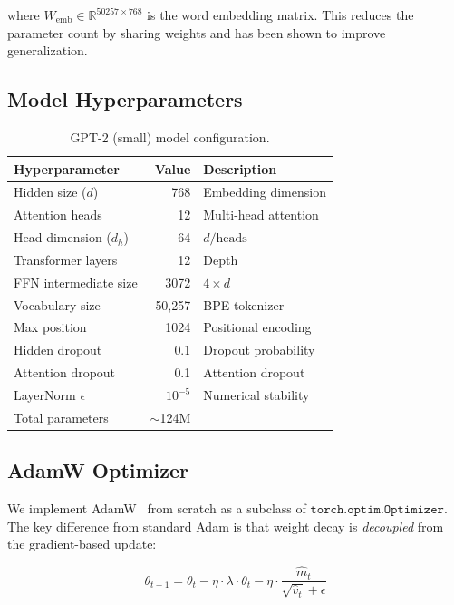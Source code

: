 \documentclass[11pt,a4paper]{article}
\begin{document}
where $W_{\text{emb}} \in \mathbb{R}^{50257 \times 768}$ is the word embedding matrix. This reduces the parameter count by sharing weights and has been shown to improve generalization.

\subsection{Model Hyperparameters}

\begin{table}[H]
\centering
\begin{tabular}{lrl}
\toprule
\textbf{Hyperparameter} & \textbf{Value} & \textbf{Description} \\
\midrule
Hidden size ($d$) & 768 & Embedding dimension \\
Attention heads & 12 & Multi-head attention \\
Head dimension ($d_h$) & 64 & $d / \text{heads}$ \\
Transformer layers & 12 & Depth \\
FFN intermediate size & 3072 & $4 \times d$ \\
Vocabulary size & 50,257 & BPE tokenizer \\
Max position & 1024 & Positional encoding \\
Hidden dropout & 0.1 & Dropout probability \\
Attention dropout & 0.1 & Attention dropout \\
LayerNorm $\epsilon$ & $10^{-5}$ & Numerical stability \\
Total parameters & $\sim$124M & \\
\bottomrule
\end{tabular}
\caption{GPT-2 (small) model configuration.}
\label{tab:config}
\end{table}

\subsection{AdamW Optimizer}

We implement AdamW~\cite{loshchilov2017decoupled} from scratch as a subclass of $\texttt{torch.optim.Optimizer}$. The key difference from standard Adam is that weight decay is \emph{decoupled} from the gradient-based update:

\begin{equation}
\theta_{t+1} = \theta_t - \eta \cdot \lambda \cdot \theta_t - \eta \cdot \frac{\hat{m}_t}{\sqrt{\hat{v}_t} + \epsilon}
\end{equation}
\end{document}
